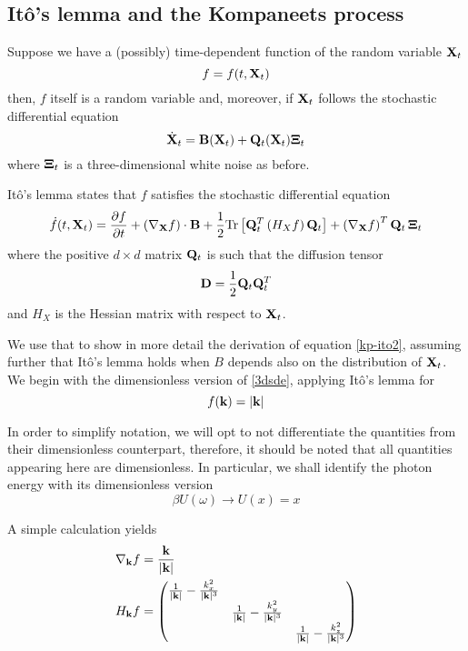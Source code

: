\documentclass[a4paper,12pt,reqno,superscriptaddress,nofootinbib]{revtex4}
\newcommand{\0}{^{(0)}}
\newcommand{\1}{^{(1)}}
\newcommand{\2}{^{(2)}}
\begin{document}
\begin{appendix}

\section{It\^o's lemma and the Kompaneets process}\label{itoder}

Suppose we have a (possibly) time-dependent function of the random variable $\vb{X}_t$
\[f=f(t,\vb{X}_t) \]
then, $f$ itself is a random variable and, moreover, if $\vb{X}_t$ follows the stochastic differential equation \begin{equation*}
	\dot{\vb{X}}_t=\vb{B}(\vb{X}_t) + \vb{Q}_t(\vb{X}_t)\vb{\Xi}_t
\end{equation*}
where $\vb{\Xi}_t$ is a three-dimensional white noise as before.

Itô's lemma states that $f$ satisfies the stochastic differential equation
\begin{equation}\label{ilem}
	\dot{f} (t, \vb{X}_t)= \frac{\partial f}{\partial t}+ \left(\nabla_{\vb{X}}f\right)\cdot\vb{B} +\frac{1}{2}\mathrm{Tr}\left[\vb{Q}^T_t\left(H_Xf\right)\vb{Q}_t\right] + \left(\nabla_{\vb{X}}f\right)^T\vb{Q}_t\, \vb{\Xi}_t
\end{equation}
where the positive $d\times d$ matrix $\vb{Q}_t$ is such that the diffusion tensor
\[\vb{D}=\frac{1}{2}\vb{Q}_t\vb{Q}^T_t\]
and $H_X$ is the Hessian matrix with respect to $\vb{X}_t$. 


We use that to show in more detail the derivation of equation \eqref{kp-ito2}, assuming further that Itô's lemma holds when $B$ depends also on the distribution of $\vb{X}_t$.  We begin with the dimensionless version of \eqref{3dsde}, applying Itô's lemma for 
\[f(\vb{k})=|\vb{k}|\]

In order to simplify notation, we will opt to not differentiate the quantities from their dimensionless counterpart, therefore, it should be noted that all quantities appearing here are dimensionless. In particular, we shall identify the photon energy with its dimensionless version
\[\beta U (\omega) \to U(x)=x\]

A simple calculation yields
\begin{align*}
	&\nabla_{\vb{k}}f =  \frac{\vb{k}}{|\vb{k}|}\\
	&H_{\vb{k}}f = 
	\begin{pmatrix}
		\frac{1}{|\vb{k}|}	-\frac{k_x^2}{|\vb{k}|^3} & & \\
		&\frac{1}{|\vb{k}|} -\frac{k_y^2}{|\vb{k}|^3}  &\\
		& & \frac{1}{|\vb{k}|}- \frac{k_z^2}{|\vb{k}|^3}
	\end{pmatrix}
\end{align*}


\end{appendix}
\end{document}
